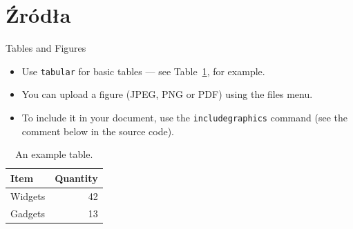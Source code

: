 \documentclass{beamer}
\begin{document}
	\section{Źródła}
	\begin{frame}{Tables and Figures}
		
		\begin{itemize}
			\item Use \texttt{tabular} for basic tables --- see Table~\ref{tab:widgets}, for example.
			\item You can upload a figure (JPEG, PNG or PDF) using the files menu. 
			\item To include it in your document, use the \texttt{includegraphics} command (see the comment below in the source code).
		\end{itemize}
		
		
		\begin{table}
			\centering
			\begin{tabular}{l|r}
				Item & Quantity \\\hline
				Widgets & 42 \\
				Gadgets & 13
			\end{tabular}
			\caption{\label{tab:widgets}An example table.}
		\end{table}
		
	\end{frame}

	
\end{document}
